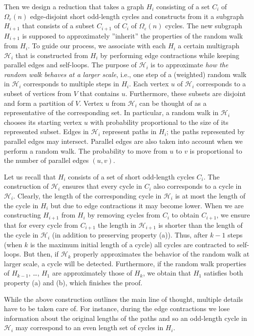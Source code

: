 \documentclass[11pt]{article}
\newcommand{\eps}{\ensuremath{\epsilon}}
\def\epsilon{\ensuremath{\varepsilon}}
\begin{document}
Then we design a reduction that takes a graph $H_i$ consisting of a set $C_i$ of $\Omega_{\eps}(n)$ edge-disjoint short odd-length cycles and constructs from it a subgraph $H_{i+1}$ that consists of a subset $C_{i+1}$ of $C_i$ of $\Omega_{\eps}(n)$ cycles. The new subgraph $H_{i+1}$ is supposed to approximately ''inherit'' the properties of the random walk from $H_i$.
To guide our process, we associate with each $H_i$ a certain multigraph $\mathcal H_i$ that is constructed from $H_i$ by performing edge contractions while keeping parallel edges and self-loops. The purpose of $\mathcal H_i$ is to approximate \emph{how the random walk behaves at a larger scale}, i.e., one step of a (weighted) random walk in $\mathcal H_i$ corresponds to multiple steps in $H_i$. Each vertex $u$ of $\mathcal H_i$ corresponds to a subset of vertices from $V$ that contains $u$. Furthermore, these subsets are disjoint and form a partition of $V$. Vertex $u$ from $\mathcal H_i$ can be thought of as a representative of the corresponding set. In particular, a random walk in $\mathcal H_i$ chooses its starting vertex $u$ with probability proportional to the size of its represented subset. Edges in $\mathcal H_i$ represent paths in $H_i$; the paths represented by parallel edges
may intersect. Parallel edges are also taken into account when we perform a random walk. The probability to move from $u$ to $v$ is proportional to the number of parallel edges $(u,v)$.

Let us recall that $H_i$ consists of a set of short odd-length cycles $C_i$. The construction of $\mathcal H_i$ ensures that every cycle in $C_i$ also corresponds to a cycle in $\mathcal H_i$. Clearly, the length of the corresponding cycle in $\mathcal H_i$ is at most the length of the cycle in $H_i$ but due to edge contractions it may become lower. When we are constructing $H_{i+1}$ from $H_i$ by removing cycles from $C_i$ to obtain $C_{i+1}$, we ensure that for every cycle from $C_{i+1}$ the length in $\mathcal H_{i+1}$ is shorter than the length of the cycle in $\mathcal H_i$ (in addition to preserving property (a)). Thus, after $k-1$ steps (when $k$ is the maximum initial length of a cycle) all cycles are contracted to self-loops. But then, if $\mathcal H_k$ properly approximates the behavior of the random walk at larger scale, a cycle will be detected. Furthermore, if the random walk properties of $H_{k-1}$, \dots, $H_1$ are approximately those of $H_k$, we obtain that $H_1$ satisfies both property (a) and (b), which finishes the proof.

While the above construction outlines the main line of thought, multiple details have to be taken care of. For instance, during the edge contractions we lose information about the original lengths of the paths and so an odd-length cycle in $\mathcal H_i$ may correspond to an even length set of cycles in $H_i$.
\end{document}

